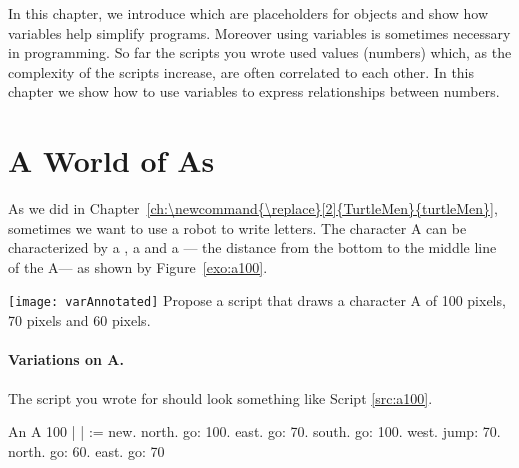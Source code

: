 In this chapter, we introduce  which are \newcommand{\replace}[2]{placeholder}{placeholders} for objects and show  how variables \newcommand{\replace}[2]{helps simplifying}{help simplify} programs. Moreover using variables is sometimes \newcommand{\replace}[2]{mandatory for}{necessary in} programming. So far the scripts you wrote used values (numbers) which, as the complexity of the scripts \newcommand{\replace}[2]{increased}{increase}, are often correlated to each other. In this chapter we show how to use variables to express \newcommand{\replace}[2]{dependencies}{relationships} between
numbers.



\section{A World of As}
As \newcommand{\replace}[2]{asked}{we did} in Chapter~\ref{ch:\newcommand{\replace}[2]{TurtleMen}{turtleMen}}, \newcommand{\replace}[2]{suppose that}{sometimes} we want to use a
robot to write letters. The \newcommand{\add}[1]{shape of the} character A \newcommand{\replace}[2]{is}{can be} characterized by a
, a  and a \strong{\dist} \newcommand{\replace}[2]{from which}{--- the distance from the bottom to} the middle line of the A\newcommand{\replace}[2]{ should be drawn}{---} as shown by Figure~\ref{exo:a100}.

\begin{exofigwithsize}{\texttt{[image: varAnnotated]}}\label{exo:a100}
Propose a script that draws a character A \newcommand{\add}[1]{with a height} of 100 \newcommand{\replace}[2]{pixel height}{pixels}, \newcommand{\add}[1]{a width of} 70
\newcommand{\replace}[2]{pixel width}{pixels} and \newcommand{\add}[1]{a \dist of} 60 \newcommand{\replace}[2]{pixel \dist}{pixels}.
\end{exofigwithsize}


\paragraph{Variations on A.}
The script you wrote for \newcommand{\remove}[1]{answering the}  should look
\newcommand{\replace}[2]{somehow}{something} like \newcommand{\replace}[2]{the following script}{Script} \ref{src:a100}.

\begin{scriptwithtitle}{An A \newcommand{\remove}[1]{of} 100\newcommand{\add}[1]{ pixels high}}\label{src:a100}
| \caro |
\caro := \Turtle new.
\caro north.
\caro go: 100.
\caro east.
\caro go: 70.
\caro south.
\caro go: 100.
\caro west.
\caro jump: 70.
\caro north.
\caro go: 60.
\caro east.
\caro go: 70
\end{scriptwithtitle}

